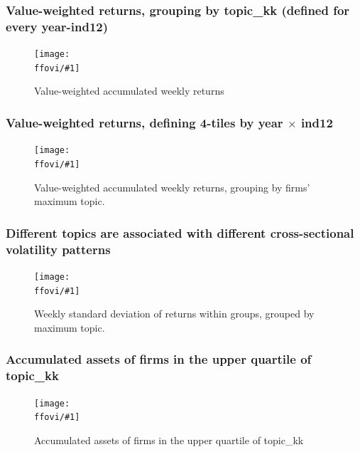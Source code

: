 \documentclass{beamer}
\newcommand{\ffovi}{dicfullmc10thr10defnob5noa0_8_6t}
\newcommand{\insertfigurevi}[2]{
\begin{figure}[h!]
  \centering
  \texttt{[image: \\ffovi/\#1]}
  \centering
  \captionsetup{font=scriptsize}
  \caption{#2}
  \label{fig:#1}
\end{figure}
}
\begin{document}
\begin{frame}
\frametitle{Value-weighted returns, grouping by topic\_kk (defined for every year-ind12)}
\insertfigurevi{awawr_aggind}{Value-weighted accumulated weekly returns}
\end{frame}

\begin{frame}
\frametitle{Value-weighted returns, defining 4-tiles by year $\times$ ind12}
\insertfigurevi{awawr_byg}{Value-weighted accumulated weekly returns, grouping by firms' maximum topic.}
\end{frame}

\begin{frame}
\frametitle{Different topics are associated with different cross-sectional volatility patterns}
\insertfigurevi{wsdr_byg}{Weekly standard deviation of returns within groups, grouped by maximum topic.}
\end{frame}

\begin{frame}
\frametitle{Accumulated assets of firms in the upper quartile of topic\_kk}
\insertfigurevi{stackedplot_at}{Accumulated assets of firms in the upper quartile of topic\_kk}
\end{frame}
\end{document}
